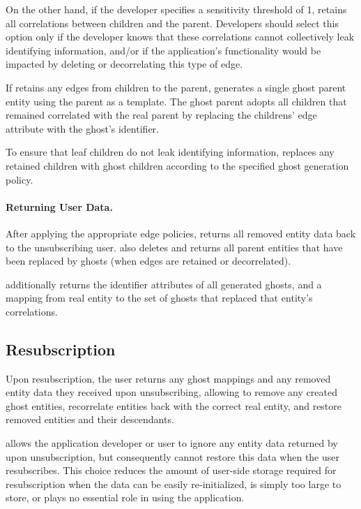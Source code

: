 On the other hand, if the developer specifies a sensitivity threshold of 1, \sys retains all
correlations between children and the parent. Developers should select this option only if the
developer knows that these correlations cannot collectively leak identifying information, and/or if
the application's functionality would be impacted by deleting or decorrelating this type of edge.

If \sys retains any edges from children to the parent, \sys generates a single ghost parent entity using the
parent as a template. The ghost parent adopts all children that remained correlated with the real
parent by replacing the childrens' edge attribute with the ghost's identifier.

To ensure that leaf children do not leak identifying information, 
\sys replaces any retained children with ghost children according to the specified ghost generation
policy.

\paragraph{Returning User Data.}
After applying the appropriate edge policies, \sys returns all 
removed entity data back to the unsubscribing user. \sys also deletes and returns all parent entities that
have been replaced by ghosts (when edges are retained or decorrelated).

\sys additionally returns the identifier attributes of all generated ghosts, and a mapping from real
entity to the set of ghosts that replaced that entity's correlations. 

\subsection{Resubscription}
Upon resubscription, the user returns any ghost mappings and any removed entity data they received
upon unsubscribing, allowing \sys to remove any created ghost entities, recorrelate entities back
with the correct real entity, and restore removed entities and their descendants. 

\sys allows the application developer or user to ignore any entity data returned by \sys upon
unsubscription, but consequently cannot restore this data when the user resubscribes.  This choice
reduces the amount of user-side storage required for resubscription when the data can be easily
re-initialized, is simply too large to store, or plays no essential role in using the application.

